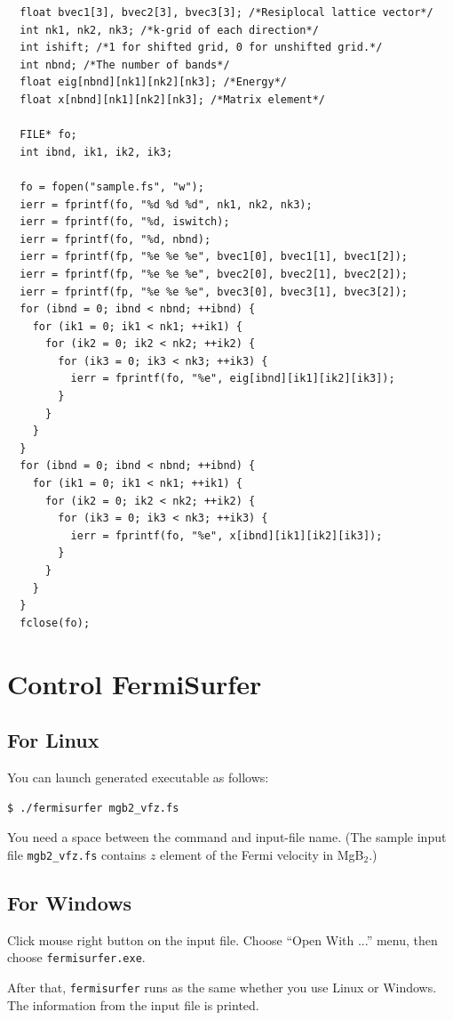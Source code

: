 \documentclass[12pt]{article}
\begin{document}
\begin{verbatim}
  float bvec1[3], bvec2[3], bvec3[3]; /*Resiplocal lattice vector*/
  int nk1, nk2, nk3; /*k-grid of each direction*/
  int ishift; /*1 for shifted grid, 0 for unshifted grid.*/
  int nbnd; /*The number of bands*/
  float eig[nbnd][nk1][nk2][nk3]; /*Energy*/
  float x[nbnd][nk1][nk2][nk3]; /*Matrix element*/

  FILE* fo;
  int ibnd, ik1, ik2, ik3;

  fo = fopen("sample.fs", "w");
  ierr = fprintf(fo, "%d %d %d", nk1, nk2, nk3);
  ierr = fprintf(fo, "%d, iswitch);
  ierr = fprintf(fo, "%d, nbnd);
  ierr = fprintf(fp, "%e %e %e", bvec1[0], bvec1[1], bvec1[2]); 
  ierr = fprintf(fp, "%e %e %e", bvec2[0], bvec2[1], bvec2[2]);
  ierr = fprintf(fp, "%e %e %e", bvec3[0], bvec3[1], bvec3[2]);
  for (ibnd = 0; ibnd < nbnd; ++ibnd) {  
    for (ik1 = 0; ik1 < nk1; ++ik1) { 
      for (ik2 = 0; ik2 < nk2; ++ik2) { 
        for (ik3 = 0; ik3 < nk3; ++ik3) { 
          ierr = fprintf(fo, "%e", eig[ibnd][ik1][ik2][ik3]); 
        } 
      } 
    } 
  } 
  for (ibnd = 0; ibnd < nbnd; ++ibnd) {  
    for (ik1 = 0; ik1 < nk1; ++ik1) { 
      for (ik2 = 0; ik2 < nk2; ++ik2) { 
        for (ik3 = 0; ik3 < nk3; ++ik3) { 
          ierr = fprintf(fo, "%e", x[ibnd][ik1][ik2][ik3]); 
        } 
      } 
    } 
  } 
  fclose(fo); 
\end{verbatim}

\section{Control FermiSurfer}

\subsection{For Linux}
You can launch generated executable as follows:
\begin{verbatim}
$ ./fermisurfer mgb2_vfz.fs
\end{verbatim}
You need a space between the command and input-file name.
(The sample input file \verb|mgb2_vfz.fs| contains
$z$ element of the Fermi velocity in MgB$_2$.)

\subsection{For Windows}
Click mouse right button on the input file.
Choose ``Open With ...'' menu,
then choose \verb|fermisurfer.exe|.

\vspace{0.5cm}
After that, \verb|fermisurfer| runs as the same whether you use Linux or Windows.
The information from the input file is printed.
\end{document}
